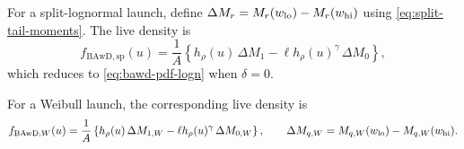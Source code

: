 \documentclass[12pt]{article}
\theoremstyle{remark}
\begin{document}
For a split-lognormal launch, define $\Delta M_r=M_r(w_{\rm lo})-M_r(w_{\rm hi})$ using
\eqref{eq:split-tail-moments}. The live density is
\begin{equation}
 f_{\mathrm{BAwD,sp}}(u)
 =\frac{1}{A}\left\{
 h_\rho(u)\,\Delta M_1
 -\ell h_\rho(u)^\gamma\,\Delta M_0\right\},
 \label{eq:bawd-pdf-split}
\end{equation}
which reduces to \eqref{eq:bawd-pdf-logn} when $\delta=0$.

For a Weibull launch, the corresponding live density is
\begin{equation}
 f_{\mathrm{BAwD},W}(u)
 =\frac{1}{A}\left\{
 h_\rho(u)\,\Delta M_{1,W}
 -\ell h_\rho(u)^\gamma\,\Delta M_{0,W}\right\},
 \qquad
 \Delta M_{q,W}=M_{q,W}(w_{\rm lo})-M_{q,W}(w_{\rm hi}).
 \label{eq:bawd-pdf-weibull}
\end{equation}
\end{document}
